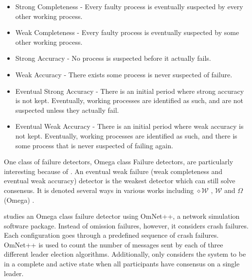 \begin{itemize}
    \item Strong Completeness - Every faulty process is eventually suspected by
        every other working process.
    \item Weak Completeness - Every faulty process is eventually suspected by 
        some other working process.
    \item Strong Accuracy - No process is suspected before it actually fails.
    \item Weak Accuracy - There exists some process is never suspected of failure.
    \item Eventual Strong Accuracy - There is an initial period where strong
        accuracy is not kept. Eventually, working processes are identified
        as such, and are not suspected unless they actually fail.
    \item Eventual Weak Accuracy - There is an initial period where weak
        accuracy is not kept. Eventually, working processes are identified
        as such, and there is some process that is never suspected of failing
        again.
\end{itemize} 

One class of failure detectors, Omega class Failure detectors, are particularly interesting because of \cite{LEADERELECTIONEVAL}. An eventual weak failure (weak completeness and eventual weak accuracy) detector is the weakest detector which can still solve consensus. It is denoted several ways in various works including $\diamond \mathcal{W}$ \cite{FAILUREDETECTORS}, $\mathcal{W}$ \cite{WEAKESTFAILURE1} \cite{WEAKESTFAILURE2} and $\Omega$ (Omega) \cite{LEADERELECTIONEVAL}.

\cite{LEADERELECTIONEVAL} studies an Omega class failure detector using OmNet++\cite{OMNET}, a network simulation software package. Instead of omission failures, however, it considers crash failures. Each configuration goes through a predefined sequence of crash failures. OmNet++ is used to count the number of messages sent by each of three different leader election algorithms. Additionally, \cite{LEADERELECTIONEVAL} only considers the system to be in a complete and active state when all participants have consensus on a single leader.
